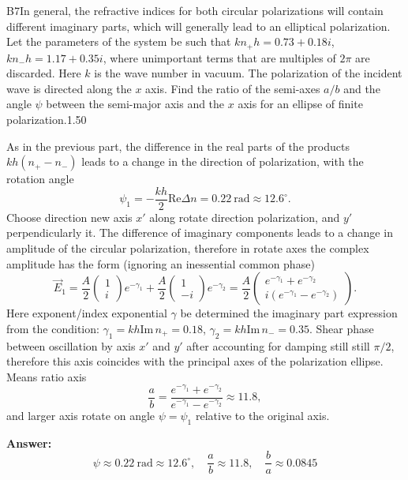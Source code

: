 \documentclass[11pt,a4paper]{article}
\begin{document}
\begin{solcard}{B7}{In general, the refractive indices for both circular polarizations will contain different imaginary parts, which will generally lead to an elliptical polarization. Let the parameters of the system be such that $kn_+h = 0.73 +0.18i$, $k n_- h = 1.17 + 0.35i$, where unimportant terms that are multiples of $2\pi$ are discarded. Here $k$ is the wave number in vacuum. The polarization of the incident wave is directed along the $x$ axis. Find the ratio of the semi-axes $a/b$ and the angle $\psi$ between the semi-major axis and the $x$ axis for an ellipse of finite polarization.}{1.50}

As in the previous part, the difference in the real parts of the products $kh (n_+ - n_-)$ leads to a change in the direction of polarization, with the rotation angle $$ \psi_1 = - \frac{k h}{2}\mathrm{Re} \Delta n = 0.22 ~\text{rad} \approx 12.6^\circ. $$Choose direction new axis $x'$ along rotate direction polarization, and $y'$ perpendicularly it. The difference of imaginary components leads to a change in amplitude of the circular polarization, therefore in rotate axes the complex amplitude has the form (ignoring an inessential common phase) $$ \vec{E}_1 = \frac{A}{2} \begin{pmatrix} 1\\ i \end{pmatrix} e^{- \gamma_1} +  \frac{A}{2} \begin{pmatrix} 1\\ -i \end{pmatrix} e^{-\gamma_2} = \frac{A}{2} \begin{pmatrix} e^{- \gamma_1} + e^{-\gamma_2} \\ i(e^{-\gamma_1} - e^{-\gamma_2})\end{pmatrix}. $$Here exponent/index exponential $\gamma$ be determined the imaginary part expression from the condition: $\gamma_1 = k h \mathrm{Im}\, n_+ = 0.18$, $\gamma_2 = k h \mathrm{Im}\, n_- = 0.35$.  Shear phase between oscillation by axis $x'$ and $y'$ after accounting for damping still still $\pi/2$, therefore this axis coincides with the principal axes of the polarization ellipse. Means ratio axis $$ \frac{a}{b} = \frac{e^{-\gamma_1} + e^{- \gamma_2}}{e^{-\gamma_1} - e^{- \gamma_2}} \approx 11.8, $$and larger axis rotate on angle $\psi = \psi_1$ relative to the original axis.

\par\smallskip\noindent\textbf{Answer:} $$ \psi \approx 0.22 ~\text{rad} \approx 12.6^\circ, \quad \frac{a}{b} \approx 11.8, \quad \frac{b}{a} \approx 0.0845 $$
\end{solcard}
\end{document}
